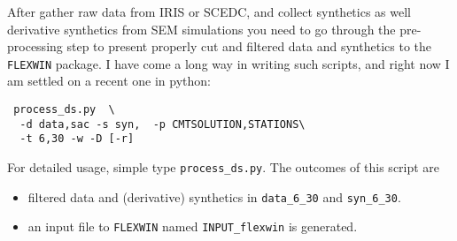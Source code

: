 \documentclass[12pt,titlepage,fleqn]{article}
\begin{document}
After gather raw data from IRIS or SCEDC, and collect synthetics as well derivative synthetics from SEM simulations you need to go through the pre-processing step to present properly cut and filtered data and synthetics to the \verb=FLEXWIN= package. I have come a long way in writing such scripts, and right now I am settled on a recent one in python:
\begin{verbatim}
 process_ds.py  \
  -d data,sac -s syn,  -p CMTSOLUTION,STATIONS\
  -t 6,30 -w -D [-r]
\end{verbatim}
For detailed usage, simple type \verb+process_ds.py+. The outcomes of this script are
\begin{itemize}
\item filtered data and (derivative) synthetics in \verb+data_6_30+ and \verb+syn_6_30+. 
\item an input file to \verb+FLEXWIN+ named \verb+INPUT_flexwin+ is generated.
\end{itemize}
\end{document}
